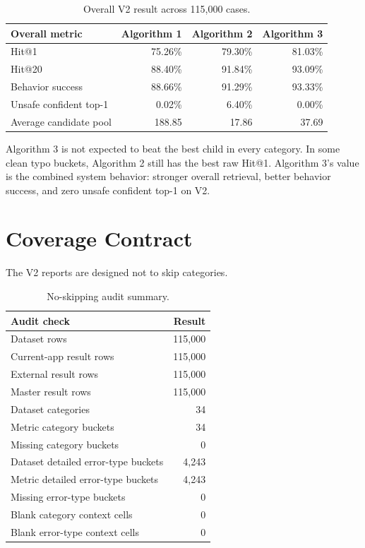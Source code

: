 \documentclass[11pt]{article}
\begin{document}
\begin{table}[H]
\centering
\small
\begin{tabular}{lrrr}
\toprule
\textbf{Overall metric} & \textbf{Algorithm 1} & \textbf{Algorithm 2} & \textbf{Algorithm 3} \\
\midrule
Hit@1 & 75.26\% & 79.30\% & 81.03\% \\
Hit@20 & 88.40\% & 91.84\% & 93.09\% \\
Behavior success & 88.66\% & 91.29\% & 93.33\% \\
Unsafe confident top-1 & 0.02\% & 6.40\% & 0.00\% \\
Average candidate pool & 188.85 & 17.86 & 37.69 \\
\bottomrule
\end{tabular}
\caption{Overall V2 result across 115,000 cases.}
\end{table}

Algorithm 3 is not expected to beat the best child in every category. In some
clean typo buckets, Algorithm 2 still has the best raw Hit@1. Algorithm 3's
value is the combined system behavior: stronger overall retrieval,
better behavior success, and zero unsafe confident top-1 on V2.

\section{Coverage Contract}

The V2 reports are designed not to skip categories.

\begin{table}[H]
\centering
\small
\begin{tabular}{lr}
\toprule
\textbf{Audit check} & \textbf{Result} \\
\midrule
Dataset rows & 115,000 \\
Current-app result rows & 115,000 \\
External result rows & 115,000 \\
Master result rows & 115,000 \\
Dataset categories & 34 \\
Metric category buckets & 34 \\
Missing category buckets & 0 \\
Dataset detailed error-type buckets & 4,243 \\
Metric detailed error-type buckets & 4,243 \\
Missing error-type buckets & 0 \\
Blank category context cells & 0 \\
Blank error-type context cells & 0 \\
\bottomrule
\end{tabular}
\caption{No-skipping audit summary.}
\end{table}
\end{document}
